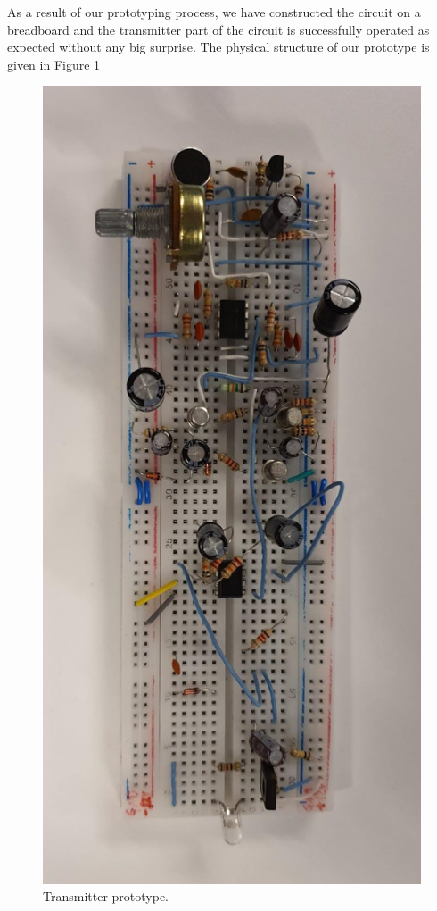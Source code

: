 \documentclass[a4paper,10pt]{IEEEtran}
\begin{document}
As a result of our prototyping process, we have constructed the circuit on a breadboard and the transmitter part of the circuit is successfully operated as expected without any big surprise. The physical structure of our prototype is given in Figure \ref{transmitter_breadboard}
\begin{figure}[htbp!]
    \centering
    \includegraphics[width = 1\linewidth]{transmitter.jpeg}
    \caption{Transmitter prototype.}
    \label{transmitter_breadboard}
\end{figure} 
\end{document}
